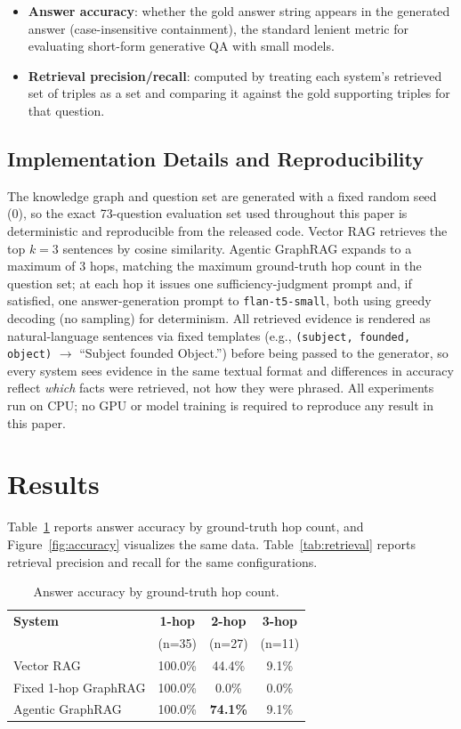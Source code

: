 \documentclass[11pt]{article}
\begin{document}
\begin{itemize}
    \item \textbf{Answer accuracy}: whether the gold answer string appears in the generated answer (case-insensitive containment), the standard lenient metric for evaluating short-form generative QA with small models.
    \item \textbf{Retrieval precision/recall}: computed by treating each system's retrieved set of triples as a set and comparing it against the gold supporting triples for that question.
\end{itemize}

\subsection{Implementation Details and Reproducibility}
\label{sec:implementation}

The knowledge graph and question set are generated with a fixed random seed (0), so the exact 73-question evaluation set used throughout this paper is deterministic and reproducible from the released code. Vector RAG retrieves the top $k{=}3$ sentences by cosine similarity. Agentic GraphRAG expands to a maximum of 3 hops, matching the maximum ground-truth hop count in the question set; at each hop it issues one sufficiency-judgment prompt and, if satisfied, one answer-generation prompt to \texttt{flan-t5-small}, both using greedy decoding (no sampling) for determinism. All retrieved evidence is rendered as natural-language sentences via fixed templates (e.g., \texttt{(subject, founded, object)} $\rightarrow$ ``Subject founded Object.'') before being passed to the generator, so every system sees evidence in the same textual format and differences in accuracy reflect \emph{which} facts were retrieved, not how they were phrased. All experiments run on CPU; no GPU or model training is required to reproduce any result in this paper.

\section{Results}
\label{sec:results}

Table~\ref{tab:accuracy} reports answer accuracy by ground-truth hop count, and Figure~\ref{fig:accuracy} visualizes the same data. Table~\ref{tab:retrieval} reports retrieval precision and recall for the same configurations.

\begin{table}[htbp]
\centering
\small
\begin{tabular}{lccc}
\toprule
\textbf{System} & \textbf{1-hop} & \textbf{2-hop} & \textbf{3-hop} \\
& (n=35) & (n=27) & (n=11) \\
\midrule
Vector RAG            & 100.0\% & 44.4\% & 9.1\% \\
Fixed 1-hop GraphRAG   & 100.0\% & 0.0\%  & 0.0\% \\
Agentic GraphRAG       & 100.0\% & \textbf{74.1\%} & 9.1\% \\
\bottomrule
\end{tabular}
\caption{Answer accuracy by ground-truth hop count.}
\label{tab:accuracy}
\end{table}
\end{document}
